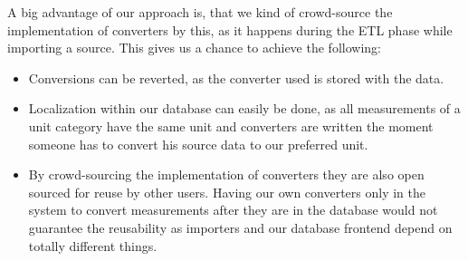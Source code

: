 A big advantage of our approach is, that we kind of crowd-source the
implementation of converters by this, as it happens during the ETL phase
while importing a source. This gives us a chance to achieve the following:

\begin{itemize}
\tightlist
\item
  Conversions can be reverted, as the converter used is stored with the
  data.
\item
  Localization within our database can easily be done, as all
  measurements of a unit category have the same unit and converters are
  written the moment someone has to convert his source data to our
  preferred unit.
\item
  By crowd-sourcing the implementation of converters they are also open
  sourced for reuse by other users. Having our own converters only in
  the system to convert measurements after they are in the database
  would not guarantee the reusability as importers and our database
  frontend depend on totally different things.
\end{itemize}

